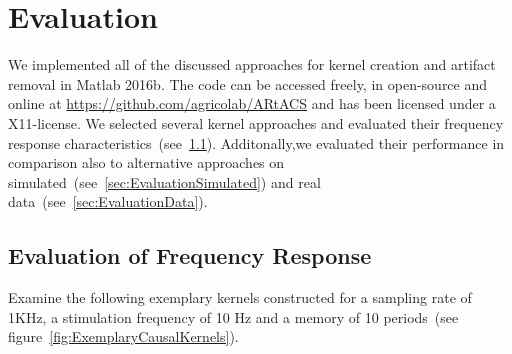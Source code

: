\documentclass[a4paper]{article}
\newcommand{\figref}[1]{(see figure~\ref{#1})}
\begin{document}
\section{Evaluation}

We implemented all of the discussed approaches for kernel creation and artifact removal in Matlab 2016b. The code can be accessed freely, in open-source and online at \url{https://github.com/agricolab/ARtACS} and has been licensed under a X11-license.
We selected several kernel approaches and evaluated their frequency response characteristics~(see~\ref{sec:EvaluationFreq}). Additonally,we evaluated their performance in comparison also to alternative approaches on simulated~(see~\ref{sec:EvaluationSimulated}) and real data~(see~\ref{sec:EvaluationData}).

\subsection{Evaluation of Frequency Response}\label{sec:EvaluationFreq}

Examine the following exemplary kernels constructed for a sampling rate of 1KHz, a stimulation frequency of 10 Hz and a memory of 10 periods~\figref{fig:ExemplaryCausalKernels}.
\end{document}
